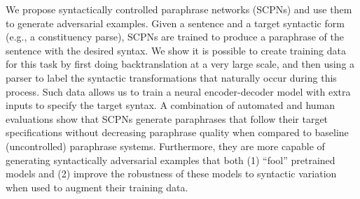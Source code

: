 We propose syntactically controlled paraphrase networks (SCPNs) and use them to generate adversarial examples. Given a sentence and a target syntactic  form (e.g., a constituency parse), SCPNs are trained to produce a paraphrase of the sentence with the desired syntax. We show it is possible to create training data for this task by first doing backtranslation at a very large scale, and then using a parser to label the syntactic transformations that naturally occur during this process. Such data allows us to train a neural encoder-decoder model with extra inputs to specify the target syntax. A combination of automated and human evaluations show that SCPNs generate paraphrases that follow their target specifications without decreasing paraphrase quality when compared to baseline (uncontrolled) paraphrase systems. Furthermore, they are more capable of generating syntactically adversarial examples that both (1) ``fool'' pretrained models and (2) improve the robustness of these models to syntactic variation when used to augment their training data.
